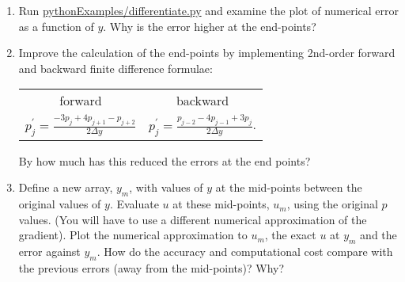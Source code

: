 \begin{enumerate}
\item Run \url{pythonExamples/differentiate.py} and examine the plot of numerical error as a function of $y$. Why is the error higher at the end-points?\\

\item Improve the calculation of the end-points by implementing 2nd-order forward and backward finite difference formulae:
\begin{center}\begin{tabular}{cc}
forward & backward \\
$p^\prime_j = \frac{-3p_{j} + 4p_{j+1} - p_{j+2}}{2\Delta y}$
&
$p^\prime_j = \frac{p_{j-2} - 4p_{j-1} + 3p_{j}}{2\Delta y}$.
\end{tabular}\end{center}
By how much has this reduced the errors at the end points?\\

\item Define a new array, $y_m$, with values of $y$ at the mid-points between the original values of $y$. Evaluate $u$ at these mid-points, $u_m$, using the original $p$ values. (You will have to use a different numerical approximation of the gradient). Plot the numerical approximation to $u_m$, the exact $u$ at $y_m$ and the error against $y_m$. How do the accuracy and computational cost compare with the previous errors (away from the mid-points)? Why?\\

\end{enumerate}
